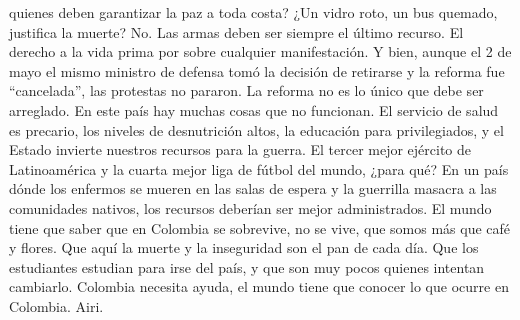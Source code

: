 \documentclass{phyasgn}\usepackage{nag}
\begin{document}
quienes deben garantizar la paz a toda costa? ¿Un vidro roto, un bus quemado, justifica la muerte? No. Las armas deben ser siempre el último recurso. El derecho a la vida prima por sobre cualquier manifestación.  Y bien, aunque el 2 de mayo el mismo ministro de defensa tomó la decisión de retirarse y la reforma fue “cancelada”, las protestas no pararon. La reforma no es lo único que debe ser arreglado. En este país hay muchas cosas que no funcionan. El servicio de salud es precario, los niveles de desnutrición altos, la educación para privilegiados, y el Estado invierte nuestros recursos para la guerra. El tercer mejor ejército de Latinoamérica y la cuarta mejor liga de fútbol del mundo, ¿para qué? En un país dónde los enfermos se mueren en las salas de espera y la guerrilla masacra a las comunidades nativos, los recursos deberían ser mejor administrados. El mundo tiene que saber que en Colombia se sobrevive, no se vive, que somos más que café y flores. Que aquí la muerte y la inseguridad son el pan de cada día. Que los estudiantes estudian para irse del país, y que son muy pocos quienes intentan cambiarlo. Colombia necesita ayuda, el mundo tiene que conocer lo que ocurre en Colombia. 
Airi.\\
\end{document}
